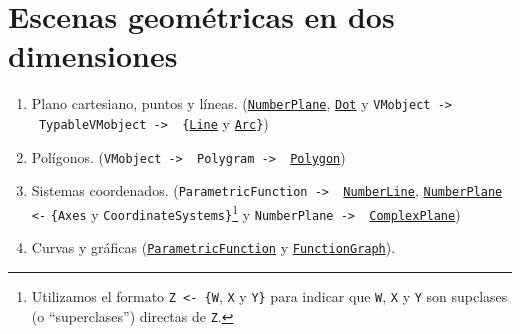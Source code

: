 \documentclass[a4paper]{article}
\begin{document}
\section{Escenas geométricas en dos dimensiones} \label{Sec: Escenas geométricas en dos dimensiones}

\begin{enumerate}

    \item Plano cartesiano, puntos y líneas. (\href{https://docs.manim.community/en/v0.16.0.post0/reference/manim.mobject.graphing.coordinate_systems.NumberPlane.html?highlight=NumberPlane}{\texttt{NumberPlane}}, \href{https://docs.manim.community/en/v0.16.0.post0/reference/manim.mobject.geometry.arc.Dot.html?highlight=Dot}{\texttt{Dot}} y \texttt{VMobject -> \ TypableVMobject -> \ \{}\href{https://docs.manim.community/en/v0.16.0.post0/reference/manim.mobject.geometry.line.Line.html#manim.mobject.geometry.line.Line}{\texttt{Line}} y \href{https://docs.manim.community/en/v0.16.0.post0/reference/manim.mobject.geometry.arc.Arc.html?highlight=Arc}{\texttt{Arc}}\texttt{\}})

    \item Polígonos. (\texttt{VMobject -> \ Polygram -> \ \href{https://docs.manim.community/en/v0.16.0.post0/reference/manim.mobject.geometry.polygram.Polygon.html?highlight=Polygon}{Polygon}})

    \item Sistemas coordenados. (\texttt{ParametricFunction -> \ \href{https://docs.manim.community/en/v0.16.0.post0/reference/manim.mobject.graphing.number_line.NumberLine.html?highlight=NumberLine}{NumberLine}}, \texttt{\href{https://docs.manim.community/en/v0.16.0.post0/reference/manim.mobject.graphing.coordinate_systems.NumberPlane.html?highlight=NumberPlane}{NumberPlane} <-} \texttt{\{Axes} y \texttt{CoordinateSystems\}}\footnote{Utilizamos el formato \texttt{Z <- \{}\texttt{W}, \texttt{X} y \texttt{Y\}} para indicar que \texttt{W}, \texttt{X} y \texttt{Y} son supclases (o ``superclases'') directas de \texttt{Z}.} y \texttt{NumberPlane -> \ \href{https://docs.manim.community/en/v0.16.0.post0/reference/manim.mobject.graphing.coordinate_systems.ComplexPlane.html?highlight=ComplexPlane}{ComplexPlane}})

    \item Curvas y gráficas (\href{https://docs.manim.community/en/v0.16.0.post0/reference/manim.mobject.graphing.functions.ParametricFunction.html#manim.mobject.graphing.functions.ParametricFunction}{\texttt{ParametricFunction}} y \href{https://docs.manim.community/en/v0.16.0.post0/reference/manim.mobject.graphing.functions.FunctionGraph.html#manim.mobject.graphing.functions.FunctionGraph}{\texttt{FunctionGraph}}).
\end{enumerate}
\end{document}
